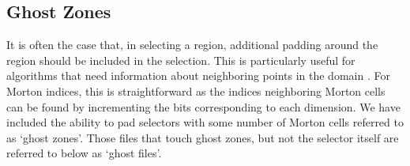 \documentclass[apjl]{emulateapj}
\begin{document}

\subsection{Ghost Zones}
It is often the case that, in selecting a region, additional padding around the region should be included in the selection. This is particularly useful for algorithms that need information about neighboring points in the domain \citep[e.g. gas properties in simulations using Smoothed Particle Hydrodynamics; SPH;][]{Monaghan1992,Springel2001,Springel2005b}. For Morton indices, this is straightforward as the indices neighboring Morton cells can be found by incrementing the bits corresponding to each dimension. We have included the ability to pad selectors with some number of Morton cells referred to as `ghost zones'. Those files that touch ghost zones, but not the selector itself are referred to below as `ghost files'. 
\end{document}

